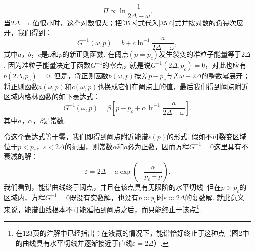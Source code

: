 \begin{equation}
\Pi\propto\ln\frac{1}{2\varDelta-\omega}.
\label{35.8}
\end{equation}
当$2\varDelta-\omega$值很小时，这个对数很大；把\eqref{35.8}式代入\eqref{35.6}式并按对数的负幂次展开，我们得到：
\begin{equation*}
G^{-1}(\omega,p)=b+c\ln^{-1}\frac{a}{2\varDelta-\omega},
\end{equation*}
式中$a$，$b$，$c$是$\omega$和$p$的新正则函数. 在阈点$(p=p_{c})$发生裂变的准粒子能量等于$2\varDelta$. 因为准粒子能量决定于函数$G^{-1}$的零点，就是说$G^{-1}(2\varDelta,p_{c})=0$，对此也应有$b(2\varDelta,p_{c})=0$. 但是，将正则函数$b(\omega,p)$按差$p-p_{c}$与差$\omega-2\varDelta$的整数幂展开；将正则函数$a(\omega,p)$和$c(\omega,p)$也换成它们在阈点上的值，最后我们得到阈点附近区域内格林函数的如下表达式：
\begin{equation}
G^{-1}(\omega,p)=\beta\left[p-p_{c}+\alpha\ln^{-1}\frac{a}{2\varDelta-\omega}\right].
\label{35.9}
\end{equation}
其中$a$，$\alpha$，$\beta$是常数.

令这个表达式等于零，我们即得到阈点附近能谱$\varepsilon(p)$的形式. 假如不可裂变区域位于$p<p_{c}$，$\varepsilon<2\varDelta$的范围，则常数$\alpha$和$a$必为正数，因而方程$G^{-1}=0$这里具有不衰减的解：
\begin{equation}
\varepsilon=2\varDelta-a\exp\left(-\frac{\alpha}{p_{c}-p}\right).
\label{35.10}
\end{equation}
我们看到，能谱曲线终于阈点，并且在该点具有无限阶的水平切线. 但在$p>p_{c}$的区域内，方程$G^{-1}=0$既没有实数解，也没有$p\approx p_{c}$时$\varepsilon\approx2\varDelta$的复数解. 就此意义来说，能谱曲线根本不可能延拓到阈点之后，而只能终止于该点\footnote{在123页的注解中已经指出：在液氦的情况下，能谱恰好终止于这种点（图2中的曲线具有水平切线并逐渐接近于直线$\varepsilon=2\varDelta$）.}.

\par\medskip{}\par\smallskip

